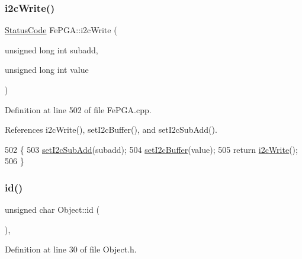 \mbox{\label{classFePGA_a45e1cfdf1f303f3958bf6a83c4e8039b}} 
\subsubsection{\texorpdfstring{i2c\+Write()}{i2cWrite()}\hspace{0.1cm}{\footnotesize\ttfamily [2/2]}}
{\footnotesize\ttfamily \hyperlink{classStatusCode}{Status\+Code} Fe\+P\+G\+A\+::i2c\+Write (\begin{DoxyParamCaption}\item[{unsigned long int}]{subadd,  }\item[{unsigned long int}]{value }\end{DoxyParamCaption})}



Definition at line 502 of file Fe\+P\+G\+A.\+cpp.



References i2c\+Write(), set\+I2c\+Buffer(), and set\+I2c\+Sub\+Add().


\begin{DoxyCode}
502                                                                            \{
503   \hyperlink{classFePGA_a37c1ee5bf89667c641f321479697166f}{setI2cSubAdd}(subadd);
504   \hyperlink{classFePGA_aaf52ed549f6b79d53f49c3f85c5fbad2}{setI2cBuffer}(value);
505   \textcolor{keywordflow}{return} \hyperlink{classFePGA_a27b9c9bb486cea35b1bbcac5da96f527}{i2cWrite}();
506 \}
\end{DoxyCode}
\mbox{\label{classObject_af99145335cc61ff6e2798ea17db009d2}} 
\subsubsection{\texorpdfstring{id()}{id()}}
{\footnotesize\ttfamily unsigned char Object\+::id (\begin{DoxyParamCaption}{ }\end{DoxyParamCaption})\hspace{0.3cm}{\ttfamily [inline]}, {\ttfamily [inherited]}}



Definition at line 30 of file Object.\+h.



